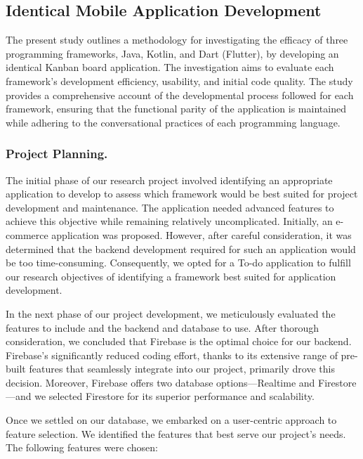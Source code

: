 \subsection{Identical Mobile Application Development}
The present study outlines a methodology for investigating the efficacy of three programming frameworks, Java, Kotlin, and Dart (Flutter), by developing an identical Kanban board application. The investigation aims to evaluate each framework's development efficiency, usability, and initial code quality. The study provides a comprehensive account of the developmental process followed for each framework, ensuring that the functional parity of the application is maintained while adhering to the conversational practices of each programming language.
\subsubsection{Project Planning.}
The initial phase of our research project involved identifying an appropriate application to develop to assess which framework would be best suited for project development and maintenance. The application needed advanced features to achieve this objective while remaining relatively uncomplicated. Initially, an e-commerce application was proposed. However, after careful consideration, it was determined that the backend development required for such an application would be too time-consuming. Consequently, we opted for a To-do application to fulfill our research objectives of identifying a framework best suited for application development.
\par
In the next phase of our project development, we meticulously evaluated the features to include and the backend and database to use. After thorough consideration, we concluded that Firebase is the optimal choice for our backend. Firebase’s significantly reduced coding effort, thanks to its extensive range of pre-built features that seamlessly integrate into our project, primarily drove this decision. Moreover, Firebase offers two database options—Realtime and Firestore—and we selected Firestore for its superior performance and scalability.
\par
Once we settled on our database, we embarked on a user-centric approach to feature selection. We identified the features that best serve our project’s needs. The following features were chosen:
